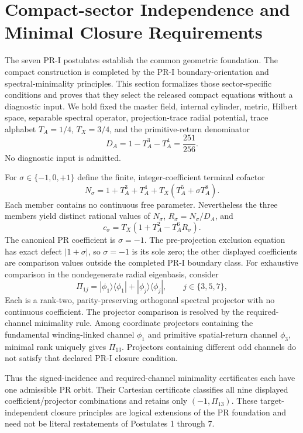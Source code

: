 \section{Compact-sector Independence and Minimal Closure Requirements}
\label{sec:pr1-compact-countermodels}

The seven PR-I postulates establish the common geometric foundation.  The compact construction is completed by the PR-I boundary-orientation and spectral-minimality principles.  This section formalizes those sector-specific conditions and proves that they select the released compact equations without a diagnostic input.  We hold fixed the master field, internal cylinder, metric, Hilbert space, separable spectral operator, projection-trace radial potential, trace alphabet $T_A=1/4$, $T_X=3/4$, and the primitive-return denominator
\begin{equation}
 D_A=1-T_A^3-T_A^4=\frac{251}{256}.
\end{equation}
No diagnostic input is admitted.

For $\sigma\in\{-1,0,+1\}$ define the finite, integer-coefficient terminal
cofactor
\begin{equation}
 N_\sigma=1+T_A^3+T_A^4+T_X\left(T_A^5+\sigma T_A^8\right).
 \label{eq:pr35-terminal-countermodels}
\end{equation}
Each member contains no continuous free parameter.  Nevertheless the three members yield distinct rational values of $N_\sigma$, $R_\sigma=N_\sigma/D_A$,
and
\begin{equation}
 c_\sigma=T_X\left(1+T_A^2-T_A^6R_\sigma\right).
\end{equation}
The canonical PR coefficient is $\sigma=-1$.  The pre-projection exclusion equation has exact defect $|1+\sigma|$, so $\sigma=-1$ is its sole zero; the other displayed coefficients are comparison values outside the completed PR-I boundary class. For exhaustive comparison in the nondegenerate radial eigenbasis, consider
\begin{equation}
 \Pi_{1j}=|\phi_1\rangle\langle\phi_1|+
 |\phi_j\rangle\langle\phi_j|,\qquad j\in\{3,5,7\},
\end{equation}
Each is a rank-two, parity-preserving orthogonal spectral projector with no continuous coefficient.  The projector comparison is resolved by the required-channel minimality rule.  Among coordinate projectors containing the fundamental winding-linked channel $\phi_1$ and primitive spatial-return
channel $\phi_3$, minimal rank uniquely gives $\Pi_{13}$.  Projectors containing different odd channels do not satisfy that declared PR-I closure condition.

Thus the signed-incidence and required-channel minimality certificates each have one admissible PR orbit.  Their Cartesian certificate classifies all nine displayed coefficient/projector combinations and retains only $(-1,\Pi_{13})$.  These target-independent closure principles are logical
extensions of the PR foundation and need not be literal restatements of Postulates 1 through 7.
